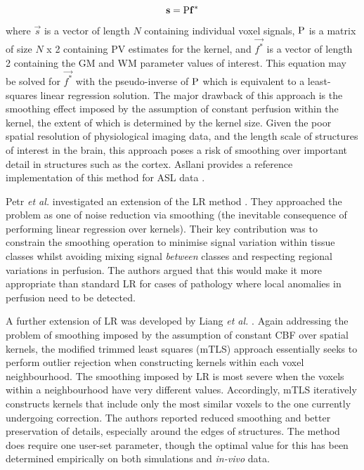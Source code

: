\begin{equation}
\mathbf{s} = \mathrm{P} \mathbf{f^*}
\end{equation} 

where $\vec{s}$ is a vector of length $N$ containing individual voxel signals, $\mathrm{P}$ is a matrix of size $N$ x 2 containing PV estimates for the kernel, and $\vec{f^*}$ is a vector of length 2 containing the GM and WM parameter values of interest. This equation may be solved for $\vec{f^*}$ with the pseudo-inverse of $\mathrm{P}$ which is equivalent to a least-squares linear regression solution. The major drawback of this approach is the smoothing effect imposed by the assumption of constant perfusion within the kernel, the extent of which is determined by the kernel size. Given the poor spatial resolution of physiological imaging data, and the length scale of structures of interest in the brain, this approach poses a risk of smoothing over important detail in structures such as the cortex. Asllani provides a reference implementation of this method for ASL data \cite{Asllani2008}. 

Petr \textit{et al.} investigated an extension of the LR method \cite{Petr2010}. They approached the problem as one of noise reduction via smoothing (the inevitable consequence of performing linear regression over kernels). Their key contribution was to constrain the smoothing operation to minimise signal variation within tissue classes whilst avoiding mixing signal \textit{between} classes and respecting regional variations in perfusion. The authors argued that this would make it more appropriate than standard LR for cases of pathology where local anomalies in perfusion need to be detected. 

A further extension of LR was developed by Liang \textit{et al.} \cite{Liang2013}. Again addressing the problem of smoothing imposed by the assumption of constant CBF over spatial kernels, the modified trimmed least squares (mTLS) approach essentially seeks to perform outlier rejection when constructing kernels within each voxel neighbourhood. The smoothing imposed by LR is most severe when the voxels within a neighbourhood have very different values. Accordingly, mTLS iteratively constructs kernels that include only the most similar voxels to the one currently undergoing correction. The authors reported reduced smoothing and better preservation of details, especially around the edges of structures. The method does require one user-set parameter, though the optimal value for this has been determined empirically on both simulations and \textit{in-vivo} data. 

